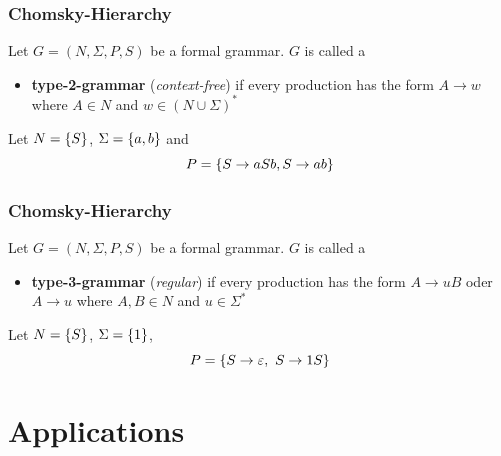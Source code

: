\documentclass{beamer}
\DeclareMathOperator{\countL}{count}
\begin{document}
	\begin{frame} \frametitle{Chomsky-Hierarchy \cite{baader}}
		Let $G = (N,\Sigma,P,S)$ be a formal grammar. $G$ is called a
		\begin{itemize}
			\item \textbf{type-2-grammar} (\textit{context-free}) if every production has the form $A \to w$ where $A \in N$ and $w \in (N \cup \Sigma)^\ast$
		\end{itemize}
	
		\pause
		
		\begin{example}[$L(G) = \countL_2$]
			Let $N = \left\{ S \right\}$, $\Sigma = \left\{ a,b \right\}$ and
			\begin{equation*}
			P = \left\{ S \to aSb, S \to ab \right\}
			\end{equation*} 
		\end{example}
	\end{frame}

	\begin{frame} \frametitle{Chomsky-Hierarchy \cite{baader}}
		Let $G = (N,\Sigma,P,S)$ be a formal grammar. $G$ is called a
		\begin{itemize}
			\item \textbf{type-3-grammar} (\textit{regular}) if every production has the form
			$A \to uB$ oder $A \to u$ where $A,B \in N$ and $u \in \Sigma^\ast$
		\end{itemize}
	
		\begin{example}[$L(G) = \N_0$]
			Let $N = \left\{ S \right\}$, $\Sigma = \left\{ 1 \right\}$, 
			\begin{equation*}
			P = \left\{ S \to \varepsilon, \ S \to 1S \right\}
			\end{equation*}
		\end{example}
	\end{frame}
	
	\section{Applications}
	
\end{document}
